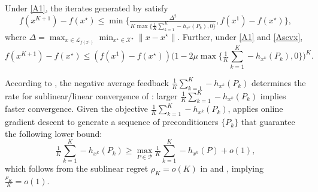 \begin{lem} \label{lem:hypergrad-to-online}
Under \ref{A1}, the iterates generated by  satisfy
\begin{equation*}
f(x^{K+1}) - f(x^\star)
\leq \min \Big\{ \tfrac{\Delta^2}{K \max \{ \frac{1}{K} \sum_{k = 1}^K - h_{x^k} (P_k), 0 \}}, f (x^1) - f (x^{\star}) \Big\},
\end{equation*}
where $\Delta = \max_{x \in \mathcal{L}_{f (x^1)}} \min_{x^{\star} \in \mathcal{X}^{\star}} \| x - x^{\star} \|$.
Further, under  \ref{A1} and \ref{Ascvx},
\begin{equation*}
f(x^{K+1}) - f(x^\star)
\leq (f (x^1) - f (x^{\star})) \big( 1 - 2 \mu \max \big\{ \tfrac{1}{K} \textstyle\sum_{k = 1}^K - h_{x^k} (P_k), 0 \big\} \big)^K.
\end{equation*}
\end{lem}

According to , the negative average feedback $\tfrac{1}{K} \textstyle\sum_{k = 1}^K - h_{x^k} (P_k)$ determines the rate for sublinear/linear convergence of : larger $\tfrac{1}{K} \textstyle\sum_{k = 1}^K - h_{x^k} (P_k)$ implies faster convergence. Given the objective $\tfrac{1}{K} \textstyle\sum_{k = 1}^K - h_{x^k} (P_k)$, {\hdm} applies online gradient descent to generate a sequence of preconditioners $\{P_k\}$ that guarantee the following lower bound:
\begin{equation} \label{eqn:avg-guarantee}
  \tfrac{1}{K} \textstyle\sum_{k = 1}^K - h_{x^k} (P_k) \geq \displaystyle \max_{P \in \mathcal{P}}  \tfrac{1}{K} \textstyle \sum_{k
  = 1}^K - h_{x^k} (P) + o(1),
\end{equation}
which follows from the sublinear regret $\rho_K = o(K)$ in  and , implying $\tfrac{\rho_K}{K} = o(1)$.